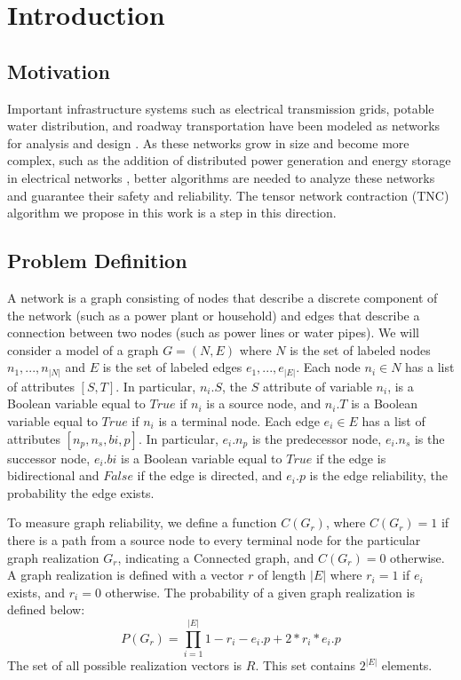 \hypertarget{introduction}{%
\section{Introduction}\label{introduction}}

\hypertarget{motivation}{%
\subsection{Motivation}\label{motivation}}

Important infrastructure systems such as electrical transmission grids, potable water distribution, and roadway transportation have been modeled as networks for analysis and design \cite{levy1967monte} \cite{cotilla2012comparing}. As these networks grow in size and become more complex, such as the addition of distributed power generation and energy storage in electrical networks \cite{escalera2018survey}, better algorithms are needed to analyze these networks and guarantee their safety and reliability. The tensor network contraction (TNC) algorithm we propose in this work is a step in this direction.

\hypertarget{problem-definition}{%
\subsection{Problem Definition}\label{problem-definition}}

A network is a graph consisting of nodes that describe a discrete component of the network (such as a power plant or household) and edges that describe a connection between two nodes (such as power lines or water pipes). We will consider a model of a graph \(G = (N,E)\) where \(N\) is the set of labeled nodes \(n_1,...,n_{|N|}\) and \(E\) is the set of labeled edges \(e_1,...,e_{|E|}\). Each node \(n_i \in N\) has a list of attributes \([S,T]\). In particular, \(n_i.S\), the \(S\) attribute of variable \(n_i\), is a Boolean variable equal to \(True\) if \(n_i\) is a source node, and \(n_i.T\) is a Boolean variable equal to \(True\) if \(n_i\) is a terminal node. Each edge \(e_i \in E\) has a list of attributes \([n_p,n_s,bi,p]\). In particular, \(e_i.n_p\) is the predecessor node, \(e_i.n_s\) is the successor node, \(e_i.bi\) is a Boolean variable equal to \(True\) if the edge is bidirectional and \(False\) if the edge is directed, and \(e_i.p\) is the edge reliability, the probability the edge exists.

To measure graph reliability, we define a function \(C(G_r)\), where \(C(G_r)=1\) if there is a path from a source node to every terminal node for the particular graph realization \(G_r\), indicating a Connected graph, and \(C(G_r)=0\) otherwise. A graph realization is defined with a vector \(r\) of length \(|E|\) where \(r_i=1\) if \(e_i\) exists, and \(r_i=0\) otherwise. The probability of a given graph realization is defined below: \[P(G_r) = \prod_{i=1}^{|E|} 1-r_i-e_i.p+2*r_i*e_i.p\] The set of all possible realization vectors is \(R\). This set contains \(2^{|E|}\) elements.

